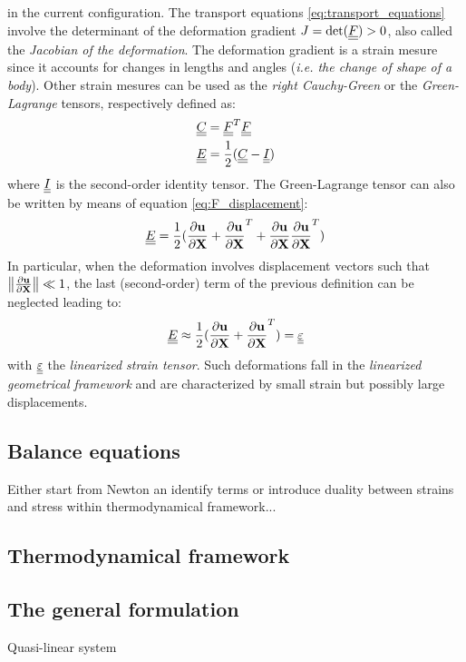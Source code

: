 in the current configuration. The transport equations \eqref{eq:transport_equations} involve the determinant of the deformation gradient $J=\det({\underline{\underline{F}}})>0$, also called the \textit{Jacobian of the deformation}. The deformation gradient is a strain mesure since it accounts for changes in lengths and angles (\textit{i.e. the change of shape of a body}). Other strain mesures can be used as the \textit{right Cauchy-Green} or the \textit{Green-Lagrange} tensors, respectively defined as:
\begin{equation*}
  \begin{aligned}
    & {\underline{\underline{C}}}={\underline{\underline{F}}}^T{\underline{\underline{F}}} \\
    & {\underline{\underline{E}}}=\frac{1}{2}({\underline{\underline{C}}}-{\underline{\underline{I}}})
  \end{aligned}
\end{equation*}
where ${\underline{\underline{I}}}$ is the second-order identity tensor. %
The Green-Lagrange tensor can also be written by means of equation \eqref{eq:F_displacement}:
\begin{equation*}
  {\underline{\underline{E}}}=\frac{1}{2}(\frac{\partial \mathbf{u}}{\partial \mathbf{X}} + \frac{\partial \mathbf{u}}{\partial \mathbf{X}}^T + \frac{\partial \mathbf{u}}{\partial \mathbf{X}}\frac{\partial \mathbf{u}}{\partial \mathbf{X}}^T)
\end{equation*}
In particular, when the deformation involves displacement vectors such that $\left\Vert\frac{\partial \mathbf{u}}{\partial \mathbf{X}}\right\Vert \ll 1$, the last (second-order) term of the previous definition can be neglected leading to:
\begin{equation*}
  {\underline{\underline{E}}} \approx \frac{1}{2}(\frac{\partial \mathbf{u}}{\partial \mathbf{X}} + \frac{\partial \mathbf{u}}{\partial \mathbf{X}}^T) = {\underline{\underline{\varepsilon}}}
\end{equation*}
with ${\underline{\underline{\varepsilon}}}$ the \textit{linearized strain tensor}. Such deformations fall in the \textit{linearized geometrical framework} and are characterized by small strain but possibly large displacements. 

\subsection{Balance equations}
Either start from Newton an identify terms or introduce duality between strains and stress within thermodynamical framework...
\subsection{Thermodynamical framework}
\subsection{The general formulation}
Quasi-linear system




